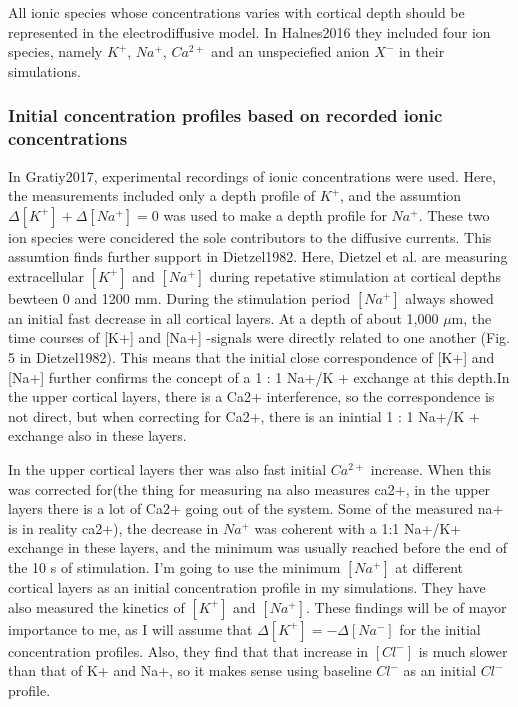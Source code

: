 \documentclass{article}
\begin{document}
All ionic species whose concentrations varies with cortical depth should be represented in the electrodiffusive model. In Halnes2016 they included four ion species, namely $K^+$, $Na^+$, $Ca^{2+}$ and an unspeciefied anion $X^-$ in their simulations.

\subsubsection{Initial concentration profiles based on recorded ionic concentrations}
 In Gratiy2017, experimental recordings of ionic concentrations were used. Here, the  measurements included only a depth profile of $K^+$, and the assumtion  $\Delta [K^+] + \Delta [Na^+] = 0$ was used to make a depth profile for $Na^+$. These two ion species were concidered the sole contributors to the diffusive currents. This assumtion finds further support in Dietzel1982. Here, Dietzel et al. are measuring extracellular $[K^+]$ and $[Na^+]$ during repetative stimulation at cortical depths bewteen 0 and 1200 mm. During the stimulation period $[Na^+]$ always showed an initial fast decrease in all cortical layers. At a depth of about 1,000 $\mu$m, the time courses of [K+] and [Na+] -signals were directly related to one another (Fig. 5 in Dietzel1982). This means that the initial close correspondence of [K+] and [Na+] further confirms the concept of a 1 : 1 Na+/K + exchange at this depth.In the upper cortical layers, there is a Ca2+ interference, so the correspondence is not direct, but when correcting for Ca2+, there is an inintial 1 : 1 Na+/K +
exchange also in these layers.


In the upper cortical layers ther was also fast initial $Ca^{2+}$ increase. When this was corrected for(the thing for measuring na also measures ca2+, in the upper layers there is a lot of Ca2+ going out of the system. Some of the measured na+ is in reality ca2+), the decrease in $Na^+$ was coherent with a 1:1 Na+/K+ exchange in these layers, and the minimum was usually reached before the end of the 10 s of stimulation. I'm going to use the minimum $[Na^+]$ at different cortical layers as an initial concentration profile in my simulations.  They have also measured the kinetics of $[K^+]$ and $[Na^+]$.   These findings will be of mayor importance to me, as I will assume that $\Delta [K^+] = - \Delta [Na^-]$ for the initial concentration profiles. Also, they find that that increase in $[Cl^-]$ is much slower than that of K+ and Na+, so it makes sense using baseline $Cl^-$ as an initial $Cl^-$ profile. 
\end{document}

